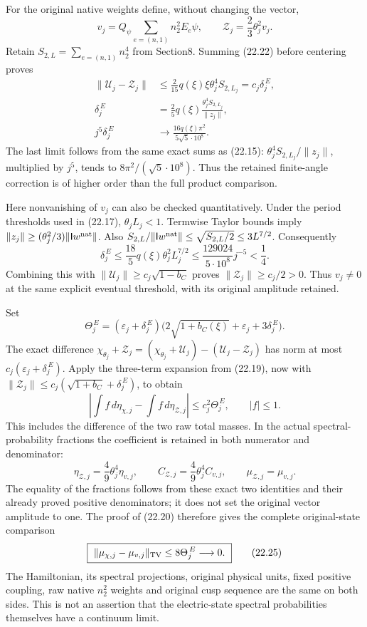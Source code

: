 \documentclass[
]{article}
\begin{document}
For the original native weights define, without changing the vector, \[
v_j=Q_\psi\sum_{e=(n,1)}n_2^2E_e\psi,\qquad
\mathcal Z_j=\frac23\theta_j^2v_j .
\] Retain \(S_{2,L}=\sum_{e=(n,1)}n_2^4\) from Section8. Summing (22.22)
before centering proves \[
\begin{aligned}
\|\mathcal U_j-\mathcal Z_j\|
 &\le\frac{2}{15}q(\xi)\xi\theta_j^4S_{2,L_j}
       =c_j\delta_j^{\,E},\\
\delta_j^{\,E}
 &=\frac25q(\xi)\frac{\theta_j^4S_{2,L_j}}{\|z_j\|},\\
j^5\delta_j^{\,E}
 &\longrightarrow\frac{16q(\xi)\pi^2}{5\sqrt5\cdot10^8}.
\end{aligned}                                                   \tag{22.23}
\] The last limit follows from the same exact sums as (22.15):
\(\theta_j^4S_{2,L_j}/\|z_j\|\), multiplied by \(j^5\), tends to
\(8\pi^2/(\sqrt5\cdot10^8)\). Thus the retained finite-angle correction
is of higher order than the full product comparison.

Here nonvanishing of \(v_j\) can also be checked quantitatively. Under
the period thresholds used in (22.17), \(\theta_jL_j<1\). Termwise
Taylor bounds imply
\(\|z_j\|\ge(\theta_j^2/3)\|\mathsf Iw^{\rm nat}\|\). Also
\(S_{2,L}/\|\mathsf Iw^{\rm nat}\|
\le\sqrt{S_{2,L}/2}\le3L^{7/2}\). Consequently \[
\delta_j^{\,E}\le
\frac{18}{5}q(\xi)\theta_j^2L_j^{7/2}
\le\frac{129024}{5\cdot10^8}j^{-5}<\frac14.
\] Combining this with \(\|\mathcal U_j\|\ge c_j\sqrt{1-b_C}\) proves
\(\|\mathcal Z_j\|\ge c_j/2>0\). Thus \(v_j\ne0\) at the same explicit
eventual threshold, with its original amplitude retained.

Set \[
\Theta_j^{\,E}
 =(\varepsilon_j+\delta_j^{\,E})
     \bigl(2\sqrt{1+b_C(\xi)}+\varepsilon_j+3\delta_j^{\,E}\bigr).
\] The exact difference \(\chi_{\theta_j}+\mathcal Z_j
 =(\chi_{\theta_j}+\mathcal U_j)
       -(\mathcal U_j-\mathcal Z_j)\) has norm at most
\(c_j(\varepsilon_j+\delta_j^{\,E})\). Apply the three-term expansion
from (22.19), now with \(\|\mathcal Z_j\|\le
c_j(\sqrt{1+b_C}+\delta_j^{\,E})\), to obtain \[
\left|\int f\,d\eta_{\chi,j}-\int f\,d\eta_{\mathcal Z,j}\right|
 \le c_j^2\Theta_j^{\,E},\qquad |f|\le1 .
                                                               \tag{22.24}
\] This includes the difference of the two raw total masses. In the
actual spectral-probability fractions the coefficient is retained in
both numerator and denominator: \[
\eta_{\mathcal Z,j}=\frac49\theta_j^4\eta_{v,j},\qquad
C_{\mathcal Z,j}=\frac49\theta_j^4C_{v,j},\qquad
\mu_{\mathcal Z,j}=\mu_{v,j}.
\] The equality of the fractions follows from these exact two identities
and their already proved positive denominators; it does not set the
original vector amplitude to one. The proof of (22.20) therefore gives
the complete original-state comparison \[
\boxed{\ 
\|\mu_{\chi,j}-\mu_{v,j}\|_{\rm TV}
 \le8\Theta_j^{\,E}\longrightarrow0 .
\ }                                                            \tag{22.25}
\] The Hamiltonian, its spectral projections, original physical units,
fixed positive coupling, raw native \(n_2^2\) weights and original cusp
sequence are the same on both sides. This is not an assertion that the
electric-state spectral probabilities themselves have a continuum limit.
\end{document}
